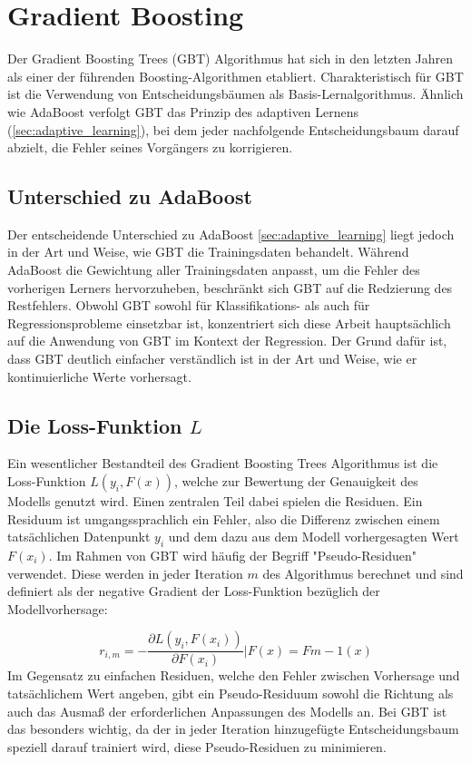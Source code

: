 \section{Gradient Boosting}
Der Gradient Boosting Trees (GBT) Algorithmus hat sich in den letzten Jahren als einer der führenden Boosting-Algorithmen etabliert. Charakteristisch für GBT ist die Verwendung von Entscheidungsbäumen als Basis-Lernalgorithmus. Ähnlich wie AdaBoost verfolgt GBT das Prinzip des adaptiven Lernens (\autoref{sec:adaptive_learning}), bei dem jeder nachfolgende Entscheidungsbaum darauf abzielt, die Fehler seines Vorgängers zu korrigieren.

\subsection{Unterschied zu AdaBoost}
Der entscheidende Unterschied zu AdaBoost \ref{sec:adaptive_learning} liegt jedoch in der Art und Weise, wie GBT die Trainingsdaten behandelt. Während AdaBoost die Gewichtung aller Trainingsdaten anpasst, um die Fehler des vorherigen Lerners hervorzuheben, beschränkt sich GBT auf die Redzierung des Restfehlers.
\newline
Obwohl GBT sowohl für Klassifikations- als auch für Regressionsprobleme einsetzbar ist, konzentriert sich diese Arbeit hauptsächlich auf die Anwendung von GBT im Kontext der Regression. Der Grund dafür ist, dass GBT deutlich einfacher verständlich ist in der Art und Weise, wie er kontinuierliche Werte vorhersagt.


\subsection{Die Loss-Funktion \( L \)}
\label{sec:loss_funtion}
Ein wesentlicher Bestandteil des Gradient Boosting Trees Algorithmus ist die Loss-Funktion \( L(y_i,F(x)) \), welche zur Bewertung der Genauigkeit des Modells genutzt wird. Einen zentralen Teil dabei spielen die Residuen. Ein Residuum ist umgangssprachlich ein Fehler, also die Differenz zwischen einem tatsächlichen Datenpunkt \( y_i \) und dem dazu aus dem Modell vorhergesagten Wert \( F(x_i) \).
Im Rahmen von GBT wird häufig der Begriff "Pseudo-Residuen" verwendet. Diese werden in jeder Iteration \( m \) des Algorithmus berechnet und sind definiert als der negative Gradient der Loss-Funktion bezüglich der Modellvorhersage:

\begin{equation}
    \label{eq:residuum_general}
    r_{i,m} = -\frac{\partial L(y_i, F(x_i))}{\partial F(x_i)}\bigg|{F(x)=F{m-1}(x)}
\end{equation}
Im Gegensatz zu einfachen Residuen, welche den Fehler zwischen Vorhersage und tatsächlichem Wert angeben, gibt ein Pseudo-Residuum sowohl die Richtung als auch das Ausmaß der erforderlichen Anpassungen des Modells an. Bei GBT ist das besonders wichtig, da der in jeder Iteration hinzugefügte Entscheidungsbaum speziell darauf trainiert wird, diese Pseudo-Residuen zu minimieren.

